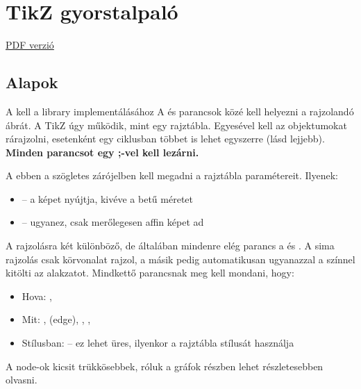 \chapter{TikZ gyorstalpal\'o}

\href{https://a-gondolkodas-orome.github.io/latex-tutorial/mainpage.pdf}{PDF verzió}

\section{Alapok}

A \code{\usepackage{tikzpicture}} kell a library implementálásához A \code{\begin{tikzpicture}} és \code{\end{tikzpicture}} parancsok közé kell helyezni a rajzolandó ábrát. A TikZ úgy működik, mint egy rajztábla. Egyesével kell az objektumokat rárajzolni, esetenként egy ciklusban többet is lehet egyszerre (lásd lejjebb). \textbf{Minden parancsot egy  ;-vel kell lezárni.}

A \code{\begin{tikzpicture}["paraméterek"]} ebben a szögletes zárójelben kell megadni a rajztábla paramétereit. Ilyenek:
\begin{itemize}
    \item {}  -- a képet nyújtja, kivéve a betű méretet
    \item {}  -- ugyanez, csak merőlegesen affin képet ad
\end{itemize}

A rajzolásra két különböző, de általában mindenre elég parancs a \code{\draw} és \code{\filldraw} . A sima rajzolás csak körvonalat rajzol, a másik pedig automatikusan ugyanazzal a színnel kitölti az alakzatot. Mindkettő parancsnak meg kell mondani, hogy:

\begin{itemize}
    \item Hova: , 
    \item Mit: , \code{--} (edge), , , 
    \item Stílusban:  -- ez lehet üres, ilyenkor a rajztábla stílusát használja
\end{itemize}

A node-ok kicsit trükkösebbek, róluk a gráfok részben lehet részletesebben olvasni.

